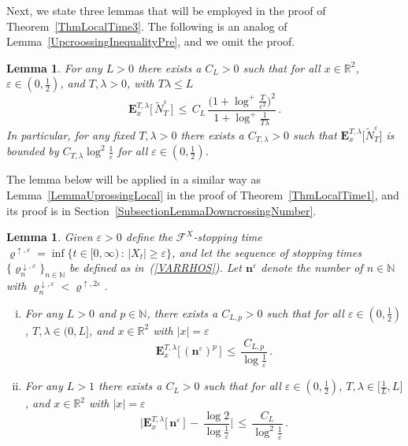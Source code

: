 \documentclass[10pt]{article}
\numberwithin{equation}{section}
\newtheorem{lemma}[theorem]{Lemma}
\theoremstyle{definition}
\newcommand{\R}{{\mathbb R}}
\begin{document}
Next, we state three lemmas that will be employed in the proof of Theorem~\ref{ThmLocalTime3}. The following is an analog of Lemma~\ref{UpcroossingInequalityPre}, and we omit the proof.
\begin{lemma}\label{UpcroossingInequalityPreII}     For any $L>0$  there exists a  $C_L>0$ such that for all $x\in \R^2$, $\varepsilon \in (0,\frac{1}{2})$, and $T,\lambda>0$,  with $T\lambda\leq L$
$$   \mathbf{E}^{T,\lambda}_{x}\big[\, \widetilde{N}_{T}^{\varepsilon}\,\big] \,\leq \,   C_L\,\frac{ \big(1+\log^+\frac{T}{\varepsilon^2}\big)^2 }{1+\log^+\frac{1}{T\lambda} }  \,. $$
In particular, for any  fixed $T,\lambda>0$ there exists a $C_{T,\lambda}>0$ such that $ \mathbf{E}^{T,\lambda}_{x}\big[ \widetilde{N}_{T}^{\varepsilon}\big] $ is bounded by $C_{T,\lambda}\log^2 \frac{1}{\varepsilon}  $ for all $\varepsilon\in (0,\frac{1}{2})$.
\end{lemma}
The  lemma below will be applied in a similar way as  Lemma~\ref{LemmaUprossingLocal} in the proof of Theorem~\ref{ThmLocalTime1}, and its 
proof is in Section~\ref{SubsectionLemmaDowncrossingNumber}. 
\begin{lemma}\label{LemmaDowncrossingNumber} Given  $\varepsilon>0$  define the $\mathscr{F}^X$-stopping time
$\varrho^{\uparrow, \varepsilon}=\inf\{ t\in [0,\infty)\,:\, |X_t| \geq \varepsilon   \}$, and let the sequence of stopping times $\{ \varrho_{n}^{\downarrow,\varepsilon} \}_{n\in \mathbb{N}} $ be defined as in~(\ref{VARRHOS}).   Let $\mathbf{n}^{\varepsilon}$ denote the number of $n\in \mathbb{N}$ with $ \varrho_{n}^{\downarrow,\varepsilon}<\varrho^{\uparrow, 2\varepsilon}$.
\begin{enumerate}[(i)]
\item For any $L >0$ and $p\in \mathbb{N}$, there exists a $C_{L,p}>0 $  such that for all $\varepsilon \in (0,\frac{1}{2})$, $T,\lambda \in (0,  L]$, and  $x\in \R^2 $ with $|x|=\varepsilon$
$$  \mathbf{E}_{x}^{T,\lambda}\big[\, (\mathbf{n}^{\varepsilon})^p\,\big]\,\leq \, \frac{ C_{L,p}}{\log \frac{1}{\varepsilon}  } \,.  $$


\item For any $L >1$ there exists a $C_{L}>0$ such that for all $\varepsilon \in (0,\frac{1}{2})$, $T,\lambda\in \big[\frac{1}{L}, L\big]$, and  $x\in \R^2 $ with $|x|=\varepsilon$
$$ \bigg| \mathbf{E}_{x}^{T,\lambda}\big[ \,\mathbf{n}^{\varepsilon} \,\big]\,-\,\frac{ \log 2  }{\log  \frac{1}{\varepsilon}  }  \bigg| \,\leq \, \frac{ C_{L}}{\log^2 \frac{1}{\varepsilon}  } \,.  $$


\end{enumerate}

\end{lemma}
\end{document}
